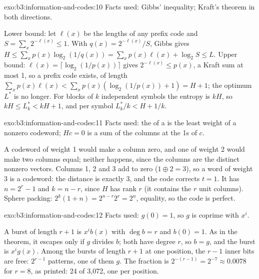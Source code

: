 \begin{solution}{exo:b3:information-and-codes:10}
Facts used: Gibbs' inequality; Kraft's theorem in both directions.

Lower bound: let $\ell(x)$ be the lengths of any prefix code and $S = \sum_x 2^{-\ell(x)} \le 1$. With $q(x) = 2^{-\ell(x)}/S$, Gibbs gives $H \le \sum_x p(x) \log_2 (1/q(x)) = \sum_x p(x) \ell(x) + \log_2 S \le L$. Upper bound: $\ell(x) = \lceil \log_2 (1/p(x)) \rceil$ gives $2^{-\ell(x)} \le p(x)$, a Kraft sum at most 1, so a prefix code exists, of length $\sum_x p(x) \ell(x) < \sum_x p(x) (\log_2 (1/p(x)) + 1) = H + 1$; the optimum $L^*$ is no longer. For blocks of $k$ independent symbols the entropy is $kH$, so $kH \le L_k^* < kH + 1$, and per symbol $L_k^*/k < H + 1/k$.
\end{solution}

\begin{solution}{exo:b3:information-and-codes:11}
Facts used: the  of a  is the least weight of a nonzero codeword; $Hc = 0$ is a sum of the columns at the 1s of $c$.

A codeword of weight 1 would make a column zero, and one of weight 2 would make two columns equal; neither happens, since the columns are the distinct nonzero vectors. Columns 1, 2 and 3 add to zero ($1 \oplus 2 = 3$), so a word of weight 3 is a codeword: the distance is exactly 3, and the code corrects $t = 1$. It has $n = 2^r - 1$ and $k = n - r$, since $H$ has rank $r$ (it contains the $r$ unit columns). Sphere packing: $2^k (1 + n) = 2^{n - r} 2^r = 2^n$, equality, so the code is perfect.
\end{solution}

\begin{solution}{exo:b3:information-and-codes:12}
Facts used: $g(0) = 1$, so $g$ is coprime with $x^i$.

A burst of length $r + 1$ is $x^i b(x)$ with $\deg b = r$ and $b(0) = 1$. As in the theorem, it escapes only if $g$ divides $b$; both have degree $r$, so $b = g$, and the burst is $x^i g(x)$. Among the bursts of length $r + 1$ at one position, the $r - 1$ inner bits are free: $2^{r - 1}$ patterns, one of them $g$. The fraction is $2^{-(r-1)} = 2^{-7} \approx 0.0078$ for $r = 8$, as printed: 24 of 3,072, one per position.
\end{solution}

